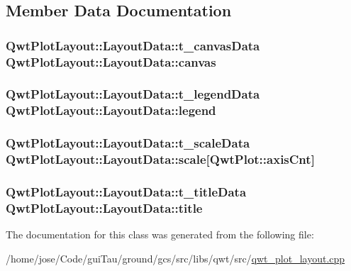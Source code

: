 \subsection{Member Data Documentation}
\hypertarget{class_qwt_plot_layout_1_1_layout_data_a21b974d44662270c906d9e800f8f8af4}{
\subsubsection[{canvas}]{ {\bf Qwt\-Plot\-Layout\-::\-Layout\-Data\-::t\-\_\-canvas\-Data}  Qwt\-Plot\-Layout\-::\-Layout\-Data\-::canvas}}\label{class_qwt_plot_layout_1_1_layout_data_a21b974d44662270c906d9e800f8f8af4}
\hypertarget{class_qwt_plot_layout_1_1_layout_data_a31526cb1d638ce4dca3718d46ba7356c}{
\subsubsection[{legend}]{ {\bf Qwt\-Plot\-Layout\-::\-Layout\-Data\-::t\-\_\-legend\-Data}  Qwt\-Plot\-Layout\-::\-Layout\-Data\-::legend}}\label{class_qwt_plot_layout_1_1_layout_data_a31526cb1d638ce4dca3718d46ba7356c}
\hypertarget{class_qwt_plot_layout_1_1_layout_data_af720ce68cae6a7fcbad9c0ca63b4fd58}{
\subsubsection[{scale}]{ {\bf Qwt\-Plot\-Layout\-::\-Layout\-Data\-::t\-\_\-scale\-Data}  Qwt\-Plot\-Layout\-::\-Layout\-Data\-::scale\mbox{[}{\bf Qwt\-Plot\-::axis\-Cnt}\mbox{]}}}\label{class_qwt_plot_layout_1_1_layout_data_af720ce68cae6a7fcbad9c0ca63b4fd58}
\hypertarget{class_qwt_plot_layout_1_1_layout_data_abd898725188ecaa2176f40bd0b7c938e}{
\subsubsection[{title}]{ {\bf Qwt\-Plot\-Layout\-::\-Layout\-Data\-::t\-\_\-title\-Data}  Qwt\-Plot\-Layout\-::\-Layout\-Data\-::title}}\label{class_qwt_plot_layout_1_1_layout_data_abd898725188ecaa2176f40bd0b7c938e}


The documentation for this class was generated from the following file\-:\begin{DoxyCompactItemize}
\item 
/home/jose/\-Code/gui\-Tau/ground/gcs/src/libs/qwt/src/\hyperlink{qwt__plot__layout_8cpp}{qwt\-\_\-plot\-\_\-layout.\-cpp}\end{DoxyCompactItemize}
